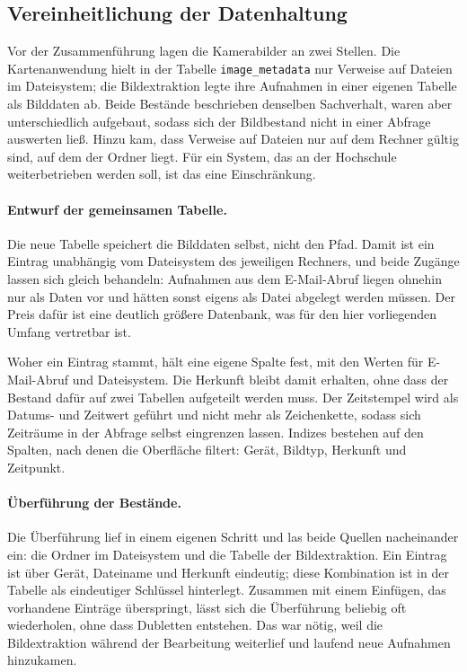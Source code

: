 \documentclass[12pt,a4paper]{report}
\begin{document}
\subsection{Vereinheitlichung der Datenhaltung}
\label{sec:datenhaltung}

Vor der Zusammenführung lagen die Kamerabilder an zwei Stellen. Die
Kartenanwendung hielt in der Tabelle \texttt{image\_metadata} nur Verweise auf
Dateien im Dateisystem; die Bildextraktion legte ihre Aufnahmen in einer eigenen
Tabelle als Bilddaten ab. Beide Bestände beschrieben denselben Sachverhalt,
waren aber unterschiedlich aufgebaut, sodass sich der Bildbestand nicht in einer
Abfrage auswerten ließ. Hinzu kam, dass Verweise auf Dateien nur auf dem Rechner
gültig sind, auf dem der Ordner liegt. Für ein System, das an der Hochschule
weiterbetrieben werden soll, ist das eine Einschränkung.

\paragraph{Entwurf der gemeinsamen Tabelle.} Die neue Tabelle speichert die
Bilddaten selbst, nicht den Pfad. Damit ist ein Eintrag unabhängig vom
Dateisystem des jeweiligen Rechners, und beide Zugänge lassen sich gleich
behandeln: Aufnahmen aus dem E-Mail-Abruf liegen ohnehin nur als Daten vor und
hätten sonst eigens als Datei abgelegt werden müssen. Der Preis dafür ist eine
deutlich größere Datenbank, was für den hier vorliegenden Umfang vertretbar ist.

Woher ein Eintrag stammt, hält eine eigene Spalte fest, mit den Werten für
E-Mail-Abruf und Dateisystem. Die Herkunft bleibt damit erhalten, ohne dass der
Bestand dafür auf zwei Tabellen aufgeteilt werden muss. Der Zeitstempel wird als
Datums- und Zeitwert geführt und nicht mehr als Zeichenkette, sodass sich
Zeiträume in der Abfrage selbst eingrenzen lassen. Indizes bestehen auf den
Spalten, nach denen die Oberfläche filtert: Gerät, Bildtyp, Herkunft und
Zeitpunkt.

\paragraph{Überführung der Bestände.} Die Überführung lief in einem eigenen
Schritt und las beide Quellen nacheinander ein: die Ordner im Dateisystem und
die Tabelle der Bildextraktion. Ein Eintrag ist über Gerät, Dateiname und
Herkunft eindeutig; diese Kombination ist in der Tabelle als eindeutiger
Schlüssel hinterlegt. Zusammen mit einem Einfügen, das vorhandene Einträge
überspringt, lässt sich die Überführung beliebig oft wiederholen, ohne dass
Dubletten entstehen. Das war nötig, weil die Bildextraktion während der
Bearbeitung weiterlief und laufend neue Aufnahmen hinzukamen.
\end{document}
